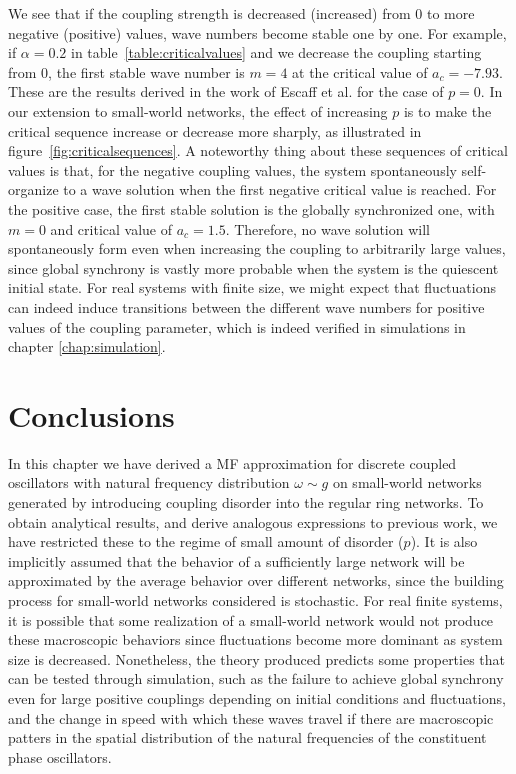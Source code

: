 \noindent We see that if the coupling strength is decreased (increased) from 0 to more negative (positive) values, wave numbers become
stable one by one. For example, if $\alpha=0.2$ in table~\ref{table:criticalvalues} and we decrease the coupling starting from 0, the
first stable wave number is $m=4$ at the critical value of $a_c=-7.93$. These are the results derived in the work of Escaff et
al.\cite{escaff2014arrays} for the case of $p=0$. In our extension to small-world networks, the effect of increasing $p$ is to make the
critical sequence increase or decrease more sharply, as illustrated in figure~\ref{fig:criticalsequences}. A noteworthy thing about
these sequences of critical values is that, for the negative coupling values, the system spontaneously self-organize to a wave solution
when the first negative critical value is reached. For the positive case, the first stable solution is the globally synchronized one,
with $m=0$ and critical value of $a_c=1.5$\cite{Wood06a,Wood06b,assis2011infinite,rodrigues2020synchronization}. Therefore, no wave
solution will spontaneously form even when increasing the coupling to arbitrarily large values, since global synchrony is vastly more
probable when the system is the quiescent initial state\cite{rodrigues2020synchronization}. For real systems with finite size, we might
expect that fluctuations can indeed induce transitions between the different wave numbers for positive values of the coupling
parameter, which is indeed verified in simulations in chapter \ref{chap:simulation}.

\section{Conclusions} In this chapter we have derived a MF approximation for discrete coupled oscillators with natural frequency
distribution $\omega\sim g$ on small-world networks generated by introducing coupling disorder into the regular ring networks. To
obtain analytical results, and derive analogous expressions to previous work, we have restricted these to the regime of small amount of
disorder ($p$). It is also implicitly assumed that the behavior of a sufficiently large network will be approximated by the average
behavior over different networks, since the building process for small-world networks considered is stochastic. For real finite
systems, it is possible that some realization of a small-world network would not produce these macroscopic behaviors since fluctuations
become more dominant as system size is decreased. Nonetheless, the theory produced predicts some properties that can be tested through
simulation, such as the failure to achieve global synchrony even for large positive couplings depending on initial conditions and
fluctuations, and the change in speed with which these waves travel if there are macroscopic patters in the spatial distribution of the
natural frequencies of the constituent phase oscillators.
